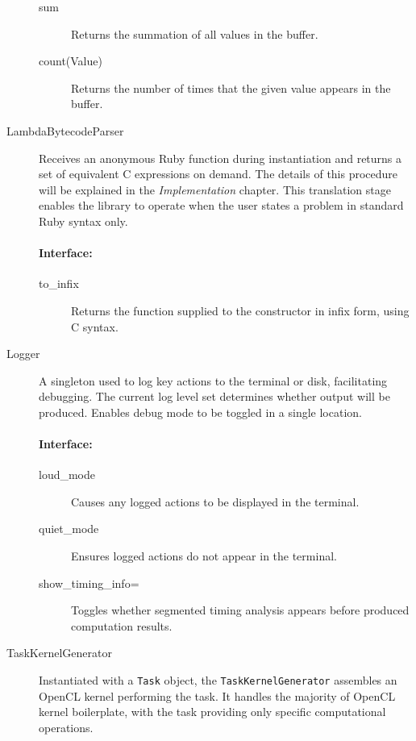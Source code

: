 \begin{description}
\begin{description}
  \item[sum] Returns the summation of all values in the buffer.

  \item[count(Value)] Returns the number of times that the given value appears in the buffer.
\end{description}

\item[LambdaBytecodeParser]
Receives an anonymous Ruby function during instantiation and returns a set of equivalent C expressions on demand. The details of this procedure will be explained in the \emph{Implementation} chapter. This translation stage enables the library to operate when the user states a problem in standard Ruby syntax only.

\paragraph*{Interface:}
\begin{description}
  \item[to\_infix] Returns the function supplied to the constructor in infix form, using C syntax.
\end{description}

\item[Logger]
A singleton used to log key actions to the terminal or disk, facilitating debugging. The current log level set determines whether output will be produced. Enables debug mode to be toggled in a single location.

\paragraph*{Interface:}
\begin{description}
  \item[loud\_mode] Causes any logged actions to be displayed in the terminal.

  \item[quiet\_mode] Ensures logged actions do not appear in the terminal.

  \item[show\_timing\_info=] Toggles whether segmented timing analysis appears before produced computation results.
\end{description}

\item[TaskKernelGenerator]
Instantiated with a \verb|Task| object, the \verb|TaskKernelGenerator| assembles an \ac{OpenCL} kernel performing the task. It handles the majority of \ac{OpenCL} kernel boilerplate, with the task providing only specific computational operations.


\end{description}
